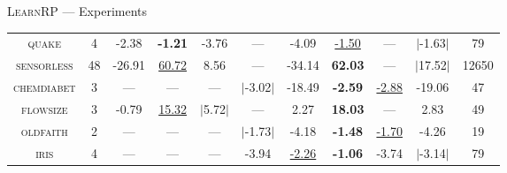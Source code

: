 \documentclass[aspectratio=169]{beamer}
\newenvironment{vhcenterb}{\vspace*{\fill}\begin{center}}{\end{center}\vspace*{\fill}}
\begin{document}
\begin{frame}[fragile]{\textsc{LearnRP} --- Experiments}
\begin{vhcenterb}
{{\begin{tabular}{cc|ccccccc|cc}
      \textsc{quake}      & 4  & -2.38  & \textbf{-1.21}  & -3.76  & ---   & -4.09    & \underline{-1.50}   & ---   & $|$-1.63$|$  & 79    \\
      \textsc{sensorless} & 48 & -26.91 & \underline{60.72}  & 8.56   & ---   & -34.14   & \textbf{62.03}   & ---   & $|$17.52$|$  & 12650 \\
      \textsc{chemdiabet} & 3  & ---    & ---    & ---    & $|$-3.02$|$ & -18.49   & \textbf{-2.59}   & \underline{-2.88} & -19.06 & 47    \\
      \textsc{flowsize}   & 3  & -0.79  & \underline{15.32}  & $|$5.72$|$   & ---   & 2.27     & \textbf{18.03}   & ---   & 2.83   & 49    \\
      \textsc{oldfaith}   & 2  & ---    & ---    & ---    & $|$-1.73$|$ & -4.18    & \textbf{-1.48}   & \underline{-1.70} & -4.26  & 19    \\
      \textsc{iris}       & 4  & ---    & ---    & ---    & -3.94 & \underline{-2.26}    & \textbf{-1.06}   & -3.74 & $|$-3.14$|$  & 79    \\
      \hline
    \end{tabular}
    }
  }
\end{vhcenterb}

\end{frame}

\end{document}
